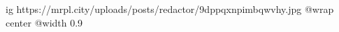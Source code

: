  
 
 
 
 

\ifcmt
  ig https://mrpl.city/uploads/posts/redactor/9dppqxnpimbqwvhy.jpg
  @wrap center
  @width 0.9
\fi
